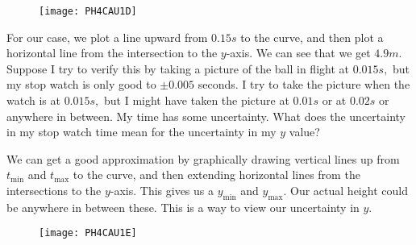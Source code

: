 \begin{figure}[h!]
	\centering
 \texttt{[image: PH4CAU1D]}
\end{figure}

For our case, we plot a line upward from $0.15\unit{s}$ to the curve, and
then plot a horizontal line from the intersection to the $y$-axis. We can
see that we get $4.9\unit{m}.$ Suppose I try to verify this by taking a
picture of the ball in flight at $0.015\unit{s},$ but my stop watch is only
good to $\pm 0.005$ seconds. I try to take the picture when the watch is at $%
0.015\unit{s},$ but I might have taken the picture at $0.01\unit{s}$ or at $%
0.02\unit{s}$ or anywhere in between. My time has some uncertainty. What
does the uncertainty in my stop watch time mean for the uncertainty in my $y$
value?

We can get a good approximation by graphically drawing vertical lines up
from $t_{\min }$ and $t_{\max }$ to the curve, and then extending horizontal
lines from the intersections to the $y$-axis. This gives us a $y_{\min }$
and $y_{\max }.$ Our actual height could be anywhere in between these. This
is a way to view our uncertainty in $y.$

\begin{figure}[h!]
	\centering
    \texttt{[image: PH4CAU1E]}
\end{figure}

